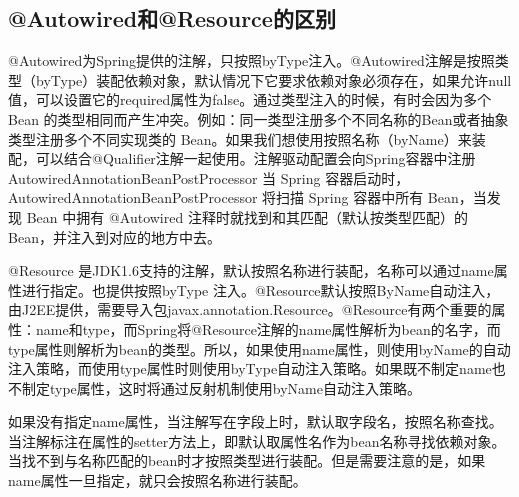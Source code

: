 \documentclass[../../../interview-questions.tex]{subfiles}
\begin{document}
\subsection{@Autowired和@Resource的区别}

@Autowired为Spring提供的注解，只按照byType注入。@Autowired注解是按照类型（byType）装配依赖对象，默认情况下它要求依赖对象必须存在，如果允许null值，可以设置它的required属性为false。通过类型注入的时候，有时会因为多个 Bean 的类型相同而产生冲突。例如：同一类型注册多个不同名称的Bean或者抽象类型注册多个不同实现类的 Bean。如果我们想使用按照名称（byName）来装配，可以结合@Qualifier注解一起使用。注解驱动配置会向Spring容器中注册AutowiredAnnotationBeanPostProcessor
当 Spring 容器启动时，AutowiredAnnotationBeanPostProcessor 将扫描 Spring 容器中所有 Bean，当发现 Bean 中拥有 @Autowired 注释时就找到和其匹配（默认按类型匹配）的 Bean，并注入到对应的地方中去。

@Resource 是JDK1.6支持的注解，默认按照名称进行装配，名称可以通过name属性进行指定。也提供按照byType 注入。@Resource默认按照ByName自动注入，由J2EE提供，需要导入包javax.annotation.Resource。@Resource有两个重要的属性：name和type，而Spring将@Resource注解的name属性解析为bean的名字，而type属性则解析为bean的类型。所以，如果使用name属性，则使用byName的自动注入策略，而使用type属性时则使用byType自动注入策略。如果既不制定name也不制定type属性，这时将通过反射机制使用byName自动注入策略。

如果没有指定name属性，当注解写在字段上时，默认取字段名，按照名称查找。
当注解标注在属性的setter方法上，即默认取属性名作为bean名称寻找依赖对象。
当找不到与名称匹配的bean时才按照类型进行装配。但是需要注意的是，如果name属性一旦指定，就只会按照名称进行装配。
\end{document}
